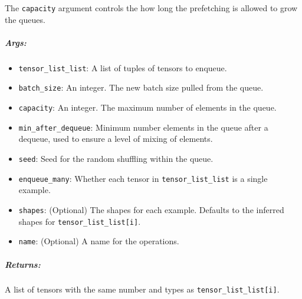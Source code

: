The \texttt{capacity} argument controls the how long the prefetching is
allowed to grow the queues.

\subparagraph{Args: }\label{args-66}

\begin{itemize}
\tightlist
\item
  \texttt{tensor\_list\_list}: A list of tuples of tensors to enqueue.
\item
  \texttt{batch\_size}: An integer. The new batch size pulled from the
  queue.
\item
  \texttt{capacity}: An integer. The maximum number of elements in the
  queue.
\item
  \texttt{min\_after\_dequeue}: Minimum number elements in the queue
  after a dequeue, used to ensure a level of mixing of elements.
\item
  \texttt{seed}: Seed for the random shuffling within the queue.
\item
  \texttt{enqueue\_many}: Whether each tensor in
  \texttt{tensor\_list\_list} is a single example.
\item
  \texttt{shapes}: (Optional) The shapes for each example. Defaults to
  the inferred shapes for \texttt{tensor\_list\_list{[}i{]}}.
\item
  \texttt{name}: (Optional) A name for the operations.
\end{itemize}

\subparagraph{Returns: }\label{returns-57}

A list of tensors with the same number and types as
\texttt{tensor\_list\_list{[}i{]}}.
